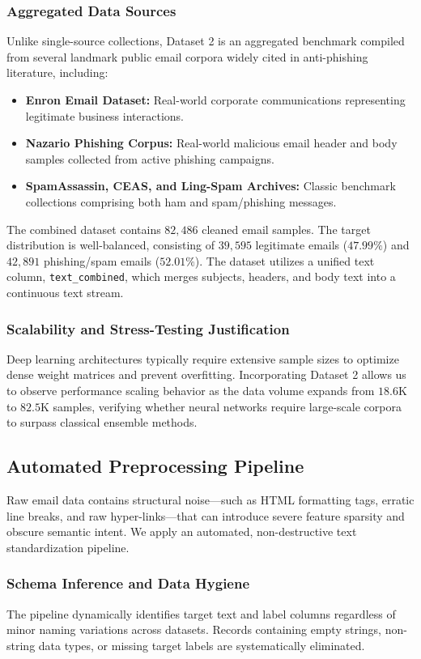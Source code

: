 \documentclass[conference]{IEEEtran}
\begin{document}
\subsubsection{Aggregated Data Sources}
Unlike single-source collections, Dataset 2 is an aggregated benchmark compiled from several landmark public email corpora widely cited in anti-phishing literature, including:
\begin{itemize}
    \item \textbf{Enron Email Dataset:} Real-world corporate communications representing legitimate business interactions.
    \item \textbf{Nazario Phishing Corpus:} Real-world malicious email header and body samples collected from active phishing campaigns.
    \item \textbf{SpamAssassin, CEAS, and Ling-Spam Archives:} Classic benchmark collections comprising both ham and spam/phishing messages.
\end{itemize}

The combined dataset contains $82,486$ cleaned email samples. The target distribution is well-balanced, consisting of $39,595$ legitimate emails ($47.99\%$) and $42,891$ phishing/spam emails ($52.01\%$). The dataset utilizes a unified text column, \texttt{text\_combined}, which merges subjects, headers, and body text into a continuous text stream.

\subsubsection{Scalability and Stress-Testing Justification}
Deep learning architectures typically require extensive sample sizes to optimize dense weight matrices and prevent overfitting. Incorporating Dataset 2 allows us to observe performance scaling behavior as the data volume expands from $18.6\text{K}$ to $82.5\text{K}$ samples, verifying whether neural networks require large-scale corpora to surpass classical ensemble methods.

\subsection{Automated Preprocessing Pipeline}
Raw email data contains structural noise---such as HTML formatting tags, erratic line breaks, and raw hyper-links---that can introduce severe feature sparsity and obscure semantic intent. We apply an automated, non-destructive text standardization pipeline.

\subsubsection{Schema Inference and Data Hygiene}
The pipeline dynamically identifies target text and label columns regardless of minor naming variations across datasets. Records containing empty strings, non-string data types, or missing target labels are systematically eliminated.
\end{document}
